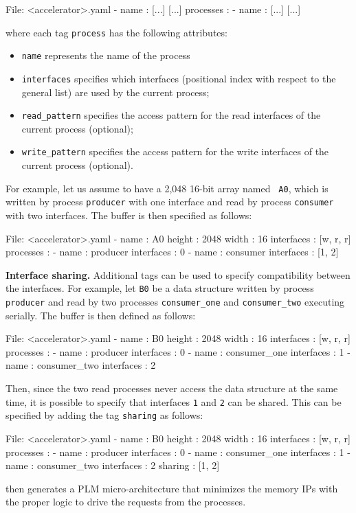 \begin{myxml}{File: <accelerator>.yaml}
  - name       : [...]
    [...]
    processes  :
      - name       : [...]
        [...]
\end{myxml}
\noindent where each tag {\tt process} has the following attributes:
\begin{itemize}
\item {\tt name} represents the name of the process 
\item {\tt interfaces} specifies which interfaces (positional index with respect to the general list) are used by the current process;
\item {\tt read\_pattern} specifies the access pattern for the read interfaces of the current process (optional);
\item {\tt write\_pattern} specifies the access pattern for the write interfaces of the current process (optional).
\end{itemize}
For example, let us assume to have a 2,048 16-bit array named {\tt
A0}, which is written by process {\tt producer} with one interface and
read by process {\tt consumer} with two interfaces. The buffer is then
specified as follows:
\begin{myxml}{File: <accelerator>.yaml}
  - name       : A0
    height     : 2048
    width      : 16
    interfaces : [w, r, r]
    processes  :
      - name       : producer
        interfaces : 0
      - name       : consumer
        interfaces : [1, 2]
\end{myxml}

\vspace{4pt}
{\bf Interface sharing.}
Additional tags can be used to specify compatibility between the interfaces. For
example, let {\tt B0} be a data structure written by process {\tt producer} and
read by two processes {\tt consumer\_one} and {\tt consumer\_two} executing
serially. The buffer is then defined as follows:
\begin{myxml}{File: <accelerator>.yaml}
  - name       : B0
    height     : 2048
    width      : 16
    interfaces : [w, r, r]
    processes  :
      - name       : producer
        interfaces : 0
      - name       : consumer_one
        interfaces : 1
      - name       : consumer_two
        interfaces : 2
\end{myxml}
\noindent Then, since the two read processes never access the data structure at the same time,
it is possible to specify that interfaces {\tt 1} and {\tt 2} can be shared. This can 
be specified by adding the tag {\tt sharing} as follows:
\begin{myxml}{File: <accelerator>.yaml}
  - name       : B0
    height     : 2048
    width      : 16
    interfaces : [w, r, r]
    processes  :
      - name       : producer
        interfaces : 0
      - name       : consumer_one
        interfaces : 1
      - name       : consumer_two
        interfaces : 2
    sharing    : [1, 2]
\end{myxml}
 then generates a PLM micro-architecture that minimizes the
memory IPs with the proper logic to drive the requests from the processes.

